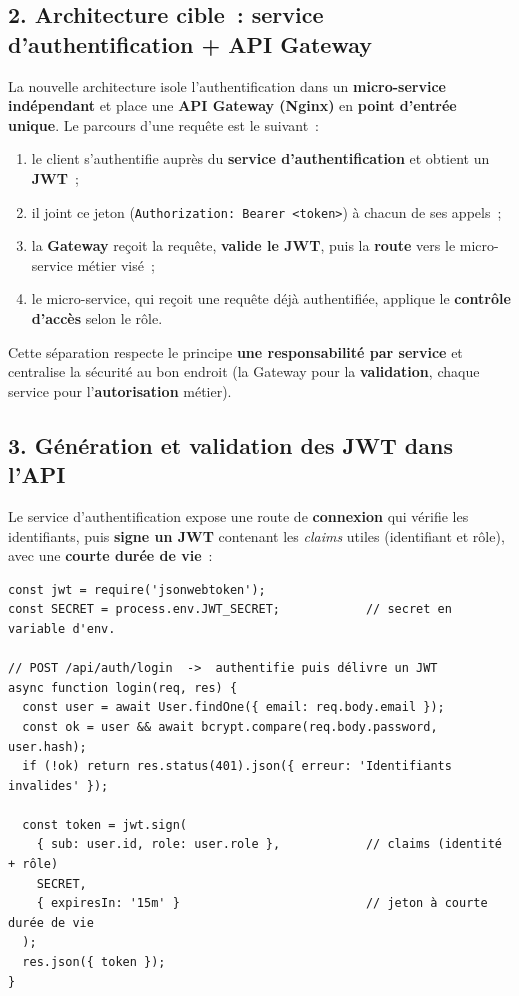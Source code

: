 \vspace{0.4cm}

\subsection*{2. Architecture cible~: service d'authentification + API Gateway}
{}
\noindent La nouvelle architecture isole l'authentification dans un \textbf{micro-service indépendant} et place une \textbf{API Gateway (Nginx)} en \textbf{point d'entrée unique}. Le parcours d'une requête est le suivant~:
\begin{enumerate}
	\item le client s'authentifie auprès du \textbf{service d'authentification} et obtient un \textbf{JWT}~;
	\item il joint ce jeton (\texttt{Authorization: Bearer <token>}) à chacun de ses appels~;
	\item la \textbf{Gateway} reçoit la requête, \textbf{valide le JWT}, puis la \textbf{route} vers le micro-service métier visé~;
	\item le micro-service, qui reçoit une requête déjà authentifiée, applique le \textbf{contrôle d'accès} selon le rôle.
\end{enumerate}
\noindent Cette séparation respecte le principe \textbf{une responsabilité par service} et centralise la sécurité au bon endroit (la Gateway pour la \textbf{validation}, chaque service pour l'\textbf{autorisation} métier).

\vspace{0.4cm}

\subsection*{3. Génération et validation des JWT dans l'API}
{}
\noindent Le service d'authentification expose une route de \textbf{connexion} qui vérifie les identifiants, puis \textbf{signe un JWT} contenant les \textit{claims} utiles (identifiant et rôle), avec une \textbf{courte durée de vie}~:

\begin{verbatim}
const jwt = require('jsonwebtoken');
const SECRET = process.env.JWT_SECRET;            // secret en variable d'env.

// POST /api/auth/login  ->  authentifie puis délivre un JWT
async function login(req, res) {
  const user = await User.findOne({ email: req.body.email });
  const ok = user && await bcrypt.compare(req.body.password, user.hash);
  if (!ok) return res.status(401).json({ erreur: 'Identifiants invalides' });

  const token = jwt.sign(
    { sub: user.id, role: user.role },            // claims (identité + rôle)
    SECRET,
    { expiresIn: '15m' }                          // jeton à courte durée de vie
  );
  res.json({ token });
}
\end{verbatim}

